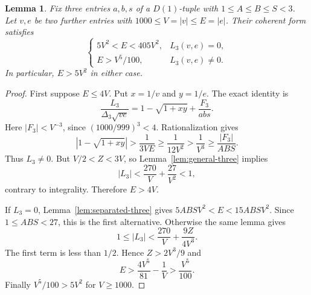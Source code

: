 \documentclass[12pt]{article}
\newtheorem{lemma}[theorem]{Lemma}
\numberwithin{equation}{section}
\begin{document}
\begin{lemma}\label{sm:five-small-anchor-alternative}
Fix three entries $a,b,s$ of a $D(1)$-tuple with
$1\le A\le B\le S<3$. Let $v,e$ be two further entries with
$1000\le V=|v|\le E=|e|$. Their coherent form satisfies
\[
 \begin{cases}
  5V^2<E<405V^2,&L_3(v,e)=0,\\
  E>V^5/100,&L_3(v,e)\ne0.
 \end{cases}
\]
In particular, $E>5V^2$ in either case.
\end{lemma}
\begin{proof}
First suppose $E\le4V$. Put $x=1/v$ and $y=1/e$.
The exact identity is
\[
 \frac{L_3}{\Delta_3\sqrt{ve}}
   =1-\sqrt{1+xy}+\frac{F_3}{abs}.
\]
Here $|F_3|<V^{-3}$, since
$(1000/999)^3<4$. Rationalization gives
\[
 |1-\sqrt{1+xy}|>\frac1{3VE}
       \ge\frac1{12V^2}>\frac1{V^3}\ge\frac{|F_3|}{ABS}.
\]
Thus $L_3\ne0$. But $V/2<Z<3V$, so
Lemma~\ref{lem:general-three} implies
\[
 |L_3|<\frac{270}{V}+\frac{27}{V^2}<1,
\]
contrary to integrality. Therefore $E>4V$.

If $L_3=0$, Lemma~\ref{lem:separated-three} gives
$5ABS V^2<E<15ABS V^2$. Since $1\le ABS<27$, this is the
first alternative. Otherwise the same lemma gives
\[
 1\le|L_3|<\frac{270}{V}+\frac{9Z}{4V^3}.
\]
The first term is less than $1/2$. Hence $Z>2V^3/9$ and
\[
 E>\frac{4V^5}{81}-\frac1V>\frac{V^5}{100}.
\]
Finally $V^5/100>5V^2$ for $V\ge1000$.
\end{proof}
\end{document}

